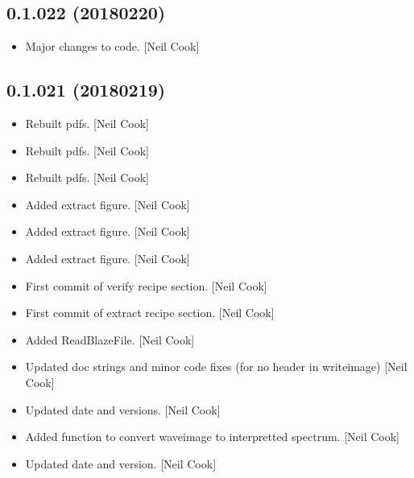 \documentclass[a4paper,10pt,english]{report}
\begin{document}
\subsection{0.1.022 (2018\sphinxhyphen{}02\sphinxhyphen{}20)}
\label{\detokenize{misc/changelog:id501}}\begin{itemize}
\item {} 
Major changes to code. {[}Neil Cook{]}

\end{itemize}


\subsection{0.1.021 (2018\sphinxhyphen{}02\sphinxhyphen{}19)}
\label{\detokenize{misc/changelog:id502}}\begin{itemize}
\item {} 
Rebuilt pdfs. {[}Neil Cook{]}

\item {} 
Rebuilt pdfs. {[}Neil Cook{]}

\item {} 
Rebuilt pdfs. {[}Neil Cook{]}

\item {} 
Added extract figure. {[}Neil Cook{]}

\item {} 
Added extract figure. {[}Neil Cook{]}

\item {} 
Added extract figure. {[}Neil Cook{]}

\item {} 
First commit of verify recipe section. {[}Neil Cook{]}

\item {} 
First commit of extract recipe section. {[}Neil Cook{]}

\item {} 
Added ReadBlazeFile. {[}Neil Cook{]}

\item {} 
Updated doc strings and minor code fixes (for no header in writeimage)
{[}Neil Cook{]}

\item {} 
Updated date and versions. {[}Neil Cook{]}

\item {} 
Added function to convert waveimage to interpretted spectrum. {[}Neil
Cook{]}

\item {} 
Updated date and version. {[}Neil Cook{]}


\end{itemize}
\end{document}
